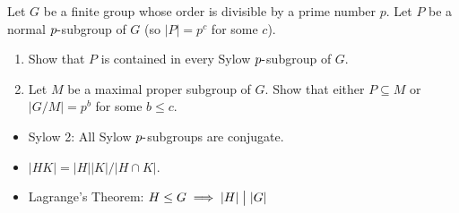 Let \(G\) be a finite group whose order is divisible by a prime number
\(p\). Let \(P\) be a normal \(p{\hbox{-}}\)subgroup of \(G\) (so
\({\left\lvert {P} \right\rvert} = p^c\) for some \(c\)).

\begin{enumerate}
\def\labelenumi{\alph{enumi}.}
\item
  Show that \(P\) is contained in every Sylow \(p{\hbox{-}}\)subgroup of
  \(G\).
\item
  Let \(M\) be a maximal proper subgroup of \(G\). Show that either
  \(P \subseteq M\) or \(|G/M | = p^b\) for some \(b \leq c\).
\end{enumerate}

\begin{concept}

\envlist

\begin{itemize}
\tightlist
\item
  Sylow 2: All Sylow \(p{\hbox{-}}\)subgroups are conjugate.
\item
  \({\left\lvert {HK} \right\rvert} = {\left\lvert {H} \right\rvert} {\left\lvert {K} \right\rvert} / {\left\lvert {H\cap K} \right\rvert}\).
\item
  Lagrange's Theorem:
  \(H\leq G \implies {\left\lvert {H} \right\rvert} \bigm|{\left\lvert {G} \right\rvert}\)
\end{itemize}

\end{concept}

